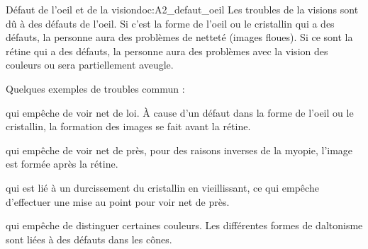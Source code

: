 

\begin{doc}{Défaut de l'oeil et de la vision}{doc:A2_defaut_oeil}
  Les troubles de la visions sont dû à des défauts de l'oeil.
  Si c'est la forme de l'oeil ou le cristallin qui a des défauts, la personne aura des problèmes de netteté (images floues).
  Si ce sont la rétine qui a des défauts, la personne aura des problèmes avec la vision des couleurs ou sera partiellement aveugle.

  Quelques exemples de troubles commun :
  \begin{listePoints}
    \item {} qui empêche de voir net de loi. À cause d'un défaut dans la forme de l'oeil ou le cristallin, la formation des images se fait avant la rétine.
    \item {} qui empêche de voir net de près, pour des raisons inverses de la myopie, l'image est formée après la rétine.
    \item {} qui est lié à un durcissement du cristallin en vieillissant, ce qui empêche d'effectuer une mise au point pour voir net de près.
    \item {} qui empêche de distinguer certaines couleurs. Les différentes formes de daltonisme sont liées à des défauts dans les cônes.
  \end{listePoints}
\end{doc}